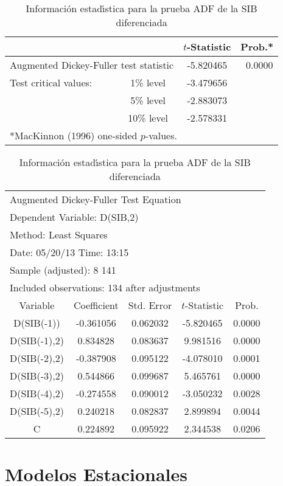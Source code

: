 \begin{ejemplo}
\begin{table}[H]
\centering\small
\caption{Informaci\'{o}n estad\'{\i}stica para la prueba ADF de la SIB diferenciada}
\begin{tabular}{lccc}
\toprule
& & $t$-Statistic& Prob.* \\
\midrule
\multicolumn{2}{l}{Augmented Dickey-Fuller test statistic} &  
-5.820465& ~0.0000 \\
Test critical values:& 1{\%} level&  -3.479656&  \\
& 5{\%} level& -2.883073&  \\
& 10{\%} level& -2.578331&  \\
\bottomrule
\multicolumn{4}{l}{*MacKinnon (1996) one-sided $p$-values.}
\end{tabular}

\vspace{8mm}
\begin{tabular}{ccccc}
\multicolumn{4}{l}{Augmented Dickey-Fuller Test Equation}  \\
\multicolumn{4}{l}{Dependent Variable: D(SIB,2)} \\
\multicolumn{4}{l}{Method: Least Squares} \\
\multicolumn{4}{l}{Date: 05/20/13 Time: 13:15} \\
\multicolumn{4}{l}{Sample (adjusted): 8 141}  \\
\multicolumn{4}{l}{Included observations: 134 after adjustments}  \\
\toprule
Variable& Coefficient& Std. Error& $t$-Statistic& Prob. \\
\midrule
D(SIB(-1))& -0.361056& 0.062032& -5.820465& 0.0000 \\
D(SIB(-1),2)& 0.834828& 0.083637& 9.981516& 0.0000 \\
D(SIB(-2),2)& -0.387908& 0.095122& -4.078010& 0.0001 \\
D(SIB(-3),2)& 0.544866& 0.099687& 5.465761& 0.0000 \\
D(SIB(-4),2)& -0.274558& 0.090012& -3.050232& 0.0028 \\
D(SIB(-5),2)& 0.240218& 0.082837& 2.899894& 0.0044 \\
C& 0.224892& 0.095922& 2.344538& 0.0206 \\
\bottomrule
\end{tabular}
\end{table}

\end{ejemplo}



\section{Modelos Estacionales}

